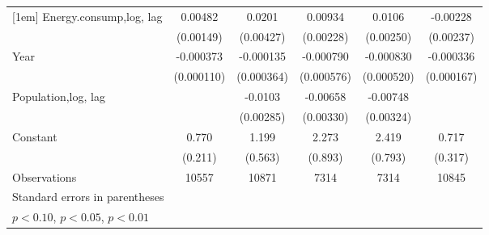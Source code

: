 \begin{table}[htbp]
\begin{tabular}{l*{5}{c}}
[1em]
Energy.consump,log, lag           &     0.00482\sym{***}&      0.0201\sym{***}&     0.00934\sym{***}&      0.0106\sym{***}&    -0.00228         \\
                    &   (0.00149)         &   (0.00427)         &   (0.00228)         &   (0.00250)         &   (0.00237)         \\
[1em]
Year                &   -0.000373\sym{***}&   -0.000135         &   -0.000790         &   -0.000830         &   -0.000336\sym{**} \\
                    &  (0.000110)         &  (0.000364)         &  (0.000576)         &  (0.000520)         &  (0.000167)         \\
[1em]
Population,log, lag             &                     &     -0.0103\sym{***}&    -0.00658\sym{**} &    -0.00748\sym{**} &                     \\
                    &                     &   (0.00285)         &   (0.00330)         &   (0.00324)         &                     \\
[1em]
Constant            &       0.770\sym{***}&       1.199\sym{**} &       2.273\sym{**} &       2.419\sym{***}&       0.717\sym{**} \\
                    &     (0.211)         &     (0.563)         &     (0.893)         &     (0.793)         &     (0.317)         \\
\hline
Observations        &       10557         &       10871         &        7314         &        7314         &       10845         \\
\hline\hline
\multicolumn{6}{l}{\footnotesize Standard errors in parentheses}\\
\multicolumn{6}{l}{\footnotesize \sym{*} \(p<0.10\), \sym{**} \(p<0.05\), \sym{***} \(p<0.01\)}\\
\end{tabular}
\end{table}
